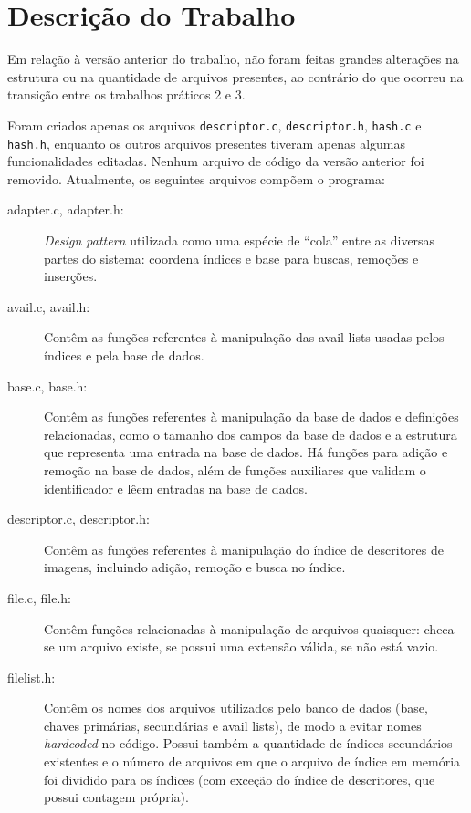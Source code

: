 \documentclass[a4paper,10pt]{article}
\begin{document}
\section{Descrição do Trabalho}
Em relação à versão anterior do trabalho, não foram feitas grandes alterações na estrutura ou na quantidade de arquivos presentes, ao contrário do que ocorreu na transição entre os trabalhos práticos 2 e 3.

Foram criados apenas os arquivos \texttt{descriptor.c}, \texttt{descriptor.h}, \texttt{hash.c} e \texttt{hash.h}, enquanto os outros arquivos presentes tiveram apenas algumas funcionalidades editadas. Nenhum arquivo de código da versão anterior foi removido. Atualmente, os seguintes arquivos compõem o programa:

\begin{description}
\item[adapter.c, adapter.h:] \textit{Design pattern}\cite{adapterwiki} utilizada como uma espécie de ``cola'' entre as diversas partes do sistema: coordena índices e base para buscas, remoções e inserções.

\item[avail.c, avail.h:] Contêm as funções referentes à manipulação das avail lists usadas pelos índices e pela base de dados.

\item[base.c, base.h:] Contêm as funções referentes à manipulação da base de dados e definições relacionadas, como o tamanho dos campos da base de dados e a estrutura que representa uma entrada na base de dados. Há funções para adição e remoção na base de dados, além de funções auxiliares que validam o identificador e lêem entradas na base de dados.

\item[descriptor.c, descriptor.h:] Contêm as funções referentes à manipulação do índice de descritores de imagens, incluindo adição, remoção e busca no índice.

 \item[file.c, file.h:] Contêm funções relacionadas à manipulação de arquivos quaisquer: checa se um arquivo existe, se possui uma extensão válida, se não está vazio.

\item[filelist.h:] Contêm os nomes dos arquivos utilizados pelo banco de dados (base, chaves primárias, secundárias e avail lists), de modo a evitar nomes \textit{hardcoded} no código. Possui também a quantidade de índices secundários existentes e o número de arquivos em que o arquivo de índice em memória foi dividido para os índices (com exceção do índice de descritores, que possui contagem própria).


\end{description}
\end{document}
